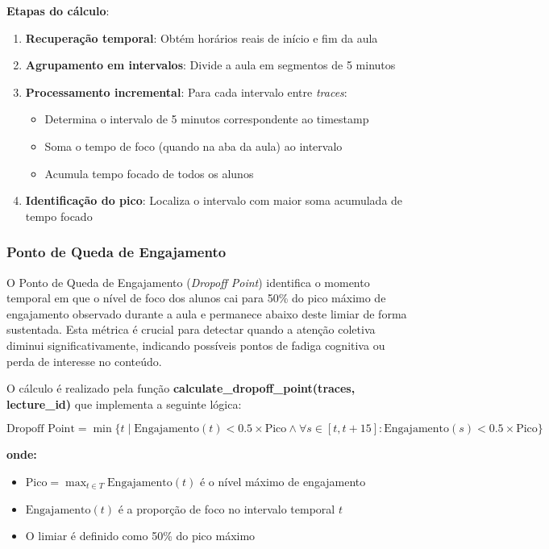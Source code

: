 \textbf{Etapas do cálculo}:
\begin{enumerate}
    \item \textbf{Recuperação temporal}: Obtém horários reais de início e fim da aula
    \item \textbf{Agrupamento em intervalos}: Divide a aula em segmentos de 5 minutos
    \item \textbf{Processamento incremental}: Para cada intervalo entre \textit{traces}:
    \begin{itemize}
        \item Determina o intervalo de 5 minutos correspondente ao timestamp
        \item Soma o tempo de foco (quando na aba da aula) ao intervalo
        \item Acumula tempo focado de todos os alunos
    \end{itemize}
    \item \textbf{Identificação do pico}: Localiza o intervalo com maior soma acumulada de tempo focado
\end{enumerate}

\subsubsection{Ponto de Queda de Engajamento}
O Ponto de Queda de Engajamento (\textit{Dropoff Point}) identifica o momento temporal em que o nível de foco dos alunos cai para 50\% do pico máximo de engajamento observado durante a aula e permanece abaixo deste limiar de forma sustentada. Esta métrica é crucial para detectar quando a atenção coletiva diminui significativamente, indicando possíveis pontos de fadiga cognitiva ou perda de interesse no conteúdo.

O cálculo é realizado pela função \textbf{calculate\_dropoff\_point(traces, lecture\_id)} que implementa a seguinte lógica:

\begin{equation}
\text{Dropoff Point} = \min\{t \mid \text{Engajamento}(t) < 0.5 \times \text{Pico} \land \forall s \in [t, t+15]: \text{Engajamento}(s) < 0.5 \times \text{Pico}\}
\end{equation}

\textbf{onde:}
\begin{itemize}
    \item $\text{Pico} = \max_{t \in T} \text{Engajamento}(t)$ é o nível máximo de engajamento
    \item $\text{Engajamento}(t)$ é a proporção de foco no intervalo temporal $t$
    \item O limiar é definido como 50\% do pico máximo
\end{itemize}

